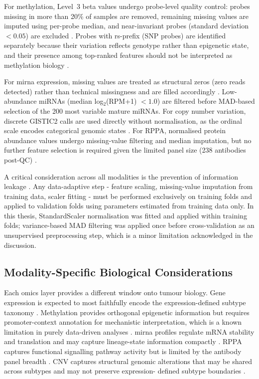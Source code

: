 For methylation, Level~3 beta values undergo probe-level quality control: probes missing in more than 20\% of samples are removed, remaining missing values are imputed using per-probe median, and near-invariant probes (standard deviation $< 0.05$) are excluded \parencite{Bibikova2011}. Probes with rs-prefix (SNP probes) are identified separately because their variation reflects genotype rather than epigenetic state, and their presence among top-ranked features should not be interpreted as methylation biology \parencite{Bibikova2011}.
 
For \gls{mirna} expression, missing values are treated as structural zeros (zero reads detected) rather than technical missingness and are filled accordingly \parencite{Wilkerson2010}. Low-abundance miRNAs (median log$_2$(RPM+1) $< 1.0$) are filtered before MAD-based selection of the 200 most variable mature miRNAs. For copy number variation, discrete GISTIC2 calls are used directly without normalisation, as the ordinal scale encodes categorical genomic states \parencite{Mermel2011}. For RPPA, normalised protein abundance values undergo missing-value filtering and median imputation, but no further feature selection is required given the limited panel size (238 antibodies post-QC) \parencite{Tibes2006}.
 
A critical consideration across all modalities is the prevention of information leakage \parencite{Vabalas2019}. Any data-adaptive step - feature scaling, missing-value imputation from training data, scaler fitting - must be performed exclusively on training folds and applied to validation folds using parameters estimated from training data only.
In this thesis, StandardScaler normalisation was fitted and applied within training folds; variance-based MAD filtering was applied once before cross-validation as an unsupervised preprocessing step, which is a minor limitation acknowledged in the discussion.


\subsection{Modality-Specific Biological Considerations}

Each omics layer provides a different window onto tumour biology. Gene expression is expected to most faithfully encode the expression-defined subtype taxonomy \parencite{Wilkerson2010}. Methylation provides orthogonal epigenetic information but requires promoter-context annotation for mechanistic interpretation, which is a known limitation in purely data-driven analyses \parencite{Bibikova2011}. \gls{mirna} profiles regulate mRNA stability and translation and may capture lineage-state information compactly \parencite{Wilkerson2010}. RPPA captures functional signalling
pathway activity but is limited by the antibody panel breadth \parencite{Tibes2006}. CNV captures structural genomic alterations that may be shared across subtypes and may not preserve expression- defined subtype boundaries \parencite{Hammerman2012}.
 
